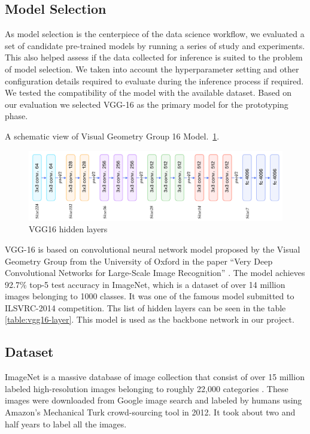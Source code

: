 \subsection{Model Selection}

As model selection is the centerpiece of the data science workflow, we evaluated a set of candidate pre-trained models by running a series of study and experiments. This also helped assess if the data collected for inference is suited to the problem of model selection. We taken into account the hyperparameter setting and other configuration details required to evaluate during the inference process if required. We tested the compatibility of the model with the available dataset. Based on our evaluation we selected VGG-16 as the primary model for the prototyping phase.

A schematic view of Visual Geometry Group 16 Model.~\ref{fig:CNN-2}.
\begin{figure}[htbp]
\centering
\includegraphics[width=1\textwidth]{images/cnn-vgg16-1.png}
\caption{VGG16 hidden layers}
\label{fig:CNN-2}
\end{figure}

VGG-16 is based on convolutional neural network model proposed by the Visual Geometry Group from the University of Oxford in the paper “Very Deep Convolutional Networks for Large-Scale Image Recognition” \cite{2014arXiv1409.1556S}. The model achieves 92.7\% top-5 test accuracy in ImageNet, which is a dataset of over 14 million images belonging to 1000 classes. It was one of the famous model submitted to ILSVRC-2014 competition. Ths list of hidden layers can be seen in the table \ref{table:vgg16-layer}. This model is used as the backbone network in our project.

\subsection{Dataset}

ImageNet is a massive database of image collection that consist of over 15 million labeled high-resolution images belonging to roughly 22,000 categories \cite{edsarx.1409.057520140101}. These images were downloaded from Google image search and labeled by humans using Amazon's Mechanical Turk crowd-sourcing tool in 2012. It took about two and half years to label all the images. 

